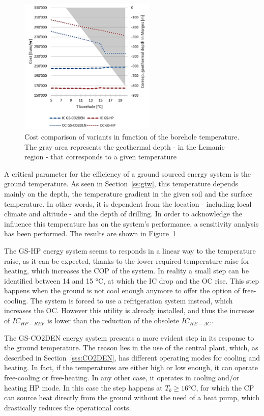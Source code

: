 \documentclass{article}
\begin{document}
\begin{figure} 
	\vspace{-20pt}
	\centering
	\includegraphics[width=0.58\textwidth]{V_SA_Tg.png}
	\caption{Cost comparison of variants in function of the borehole temperature. The gray area represents the geothermal depth - in the Lemanic region - that corresponds to a given temperature}
	\label{fig:V_SA_Tg}
	\vspace{-10pt}
\end{figure}

A critical parameter for the efficiency of a ground sourced energy system is the ground temperature. As seen in Section~\ref{ss:gtw}, this temperature depends mainly on the depth, the temperature gradient in the given soil and the surface temperature. In other words, it is dependent from the location - including local climate and altitude - and the depth of drilling. In order to acknowledge the influence this temperature has on the system's performance, a sensitivity analysis has been performed. The results are shown in Figure~\ref{fig:V_SA_Tg}

The GS-HP energy system seems to responds in a linear way to the temperature raise, as it can be expected, thanks to the lower required temperature raise for heating, which increases the COP of the system. In reality a small step can be identified between 14 and 15 \si{\celsius}, at which the IC drop and the OC rise. This step happens when the ground is not cool enough anymore to offer the option of free-cooling. The system is forced to use a refrigeration system instead, which increases the OC. However this utility is already installed, and thus the increase of $IC_{HP-REF}$ is lower than the reduction of the obsolete $IC_{HE-AC}$.

The GS-CO2DEN energy system presents a more evident step in its response to the ground temperature. The reason lies in the use of the central plant, which, as described in Section~\ref{sss:CO2DEN}, has different operating modes for cooling and heating. In fact, if the temperatures are either high or low enough, it can operate free-cooling or free-heating. In any other case, it operates in cooling and/or heating HP mode. In this case the step happens at $T_{b} \geq 16 \si{\celsius}$, for which the CP can source heat directly from the ground without the need of a heat pump, which drastically reduces the operational costs.
\end{document}

